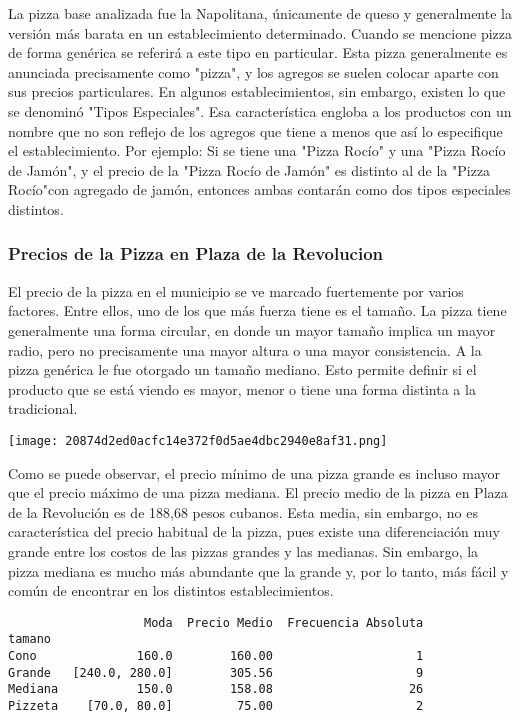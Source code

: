 La pizza base analizada fue la Napolitana, únicamente de queso y
generalmente la versión más barata en un establecimiento determinado.
Cuando se mencione pizza de forma genérica se referirá a este tipo en
particular. Esta pizza generalmente es anunciada precisamente como
"pizza", y los agregos se suelen colocar aparte con sus precios
particulares. En algunos establecimientos, sin embargo, existen lo que
se denominó "Tipos Especiales". Esa característica engloba a los
productos con un nombre que no son reflejo de los agregos que tiene a
menos que así lo especifique el establecimiento. Por ejemplo: Si se
tiene una "Pizza Rocío" y una "Pizza Rocío de Jamón", y el precio de la
"Pizza Rocío de Jamón" es distinto al de la "Pizza Rocío"con agregado de
jamón, entonces ambas contarán como dos tipos especiales distintos.

\hypertarget{precios-de-la-pizza-en-plaza-de-la-revolucion}{%
\subsubsection{Precios de la Pizza en Plaza de la
Revolucion}\label{precios-de-la-pizza-en-plaza-de-la-revolucion}}

El precio de la pizza en el municipio se ve marcado fuertemente por
varios factores. Entre ellos, uno de los que más fuerza tiene es el
tamaño. La pizza tiene generalmente una forma circular, en donde un
mayor tamaño implica un mayor radio, pero no precisamente una mayor
altura o una mayor consistencia. A la pizza genérica le fue otorgado un
tamaño mediano. Esto permite definir si el producto que se está viendo
es mayor, menor o tiene una forma distinta a la tradicional.


\texttt{[image: 20874d2ed0acfc14e372f0d5ae4dbc2940e8af31.png]}

Como se puede observar, el precio mínimo de una pizza grande es incluso
mayor que el precio máximo de una pizza mediana. El precio medio de la
pizza en Plaza de la Revolución es de 188,68 pesos cubanos. Esta media,
sin embargo, no es característica del precio habitual de la pizza, pues
existe una diferenciación muy grande entre los costos de las pizzas
grandes y las medianas. Sin embargo, la pizza mediana es mucho más
abundante que la grande y, por lo tanto, más fácil y común de encontrar
en los distintos establecimientos.


\begin{verbatim}
                   Moda  Precio Medio  Frecuencia Absoluta
tamano                                                    
Cono              160.0        160.00                    1
Grande   [240.0, 280.0]        305.56                    9
Mediana           150.0        158.08                   26
Pizzeta    [70.0, 80.0]         75.00                    2
\end{verbatim}

